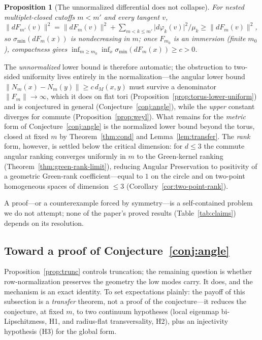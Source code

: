 \documentclass[11pt]{article}
\newtheorem{proposition}[theorem]{Proposition}
\theoremstyle{remark}
\begin{document}
\begin{proposition}[The unnormalized differential does not collapse]\label{prop:sigmamin}
For nested multiplet-closed cutoffs $m<m'$ and every tangent $v$,
$\lVert dF_{m'}(v)\rVert^2=\lVert dF_m(v)\rVert^2+\sum_{m<k\le m'}\lvert d\varphi_k(v)\rvert^2/\mu_k
\ge\lVert dF_m(v)\rVert^2$, so $\sigma_{\min}(dF_m(x))$ is nondecreasing in $m$;
once $F_{m_0}$ is an immersion (finite $m_0$ \cite{berard1994}), compactness gives
$\inf_{m\ge m_0}\inf_{x}\sigma_{\min}(dF_m(x))\ge c>0$.
\end{proposition}

\noindent The \emph{unnormalized} lower bound is therefore automatic; the
obstruction to two-sided uniformity lives entirely in the normalization---the
angular lower bound $\lVert N_m(x)-N_m(y)\rVert\ge c\,d_M(x,y)$ must survive a
denominator $\lVert F_m\rVert\to\infty$, which it does on flat tori
(Proposition~\ref{prop:torus-lower-uniform}) and is conjectured in general
(Conjecture~\ref{conj:angle}), while the \emph{upper} constant diverges for commute
(Proposition~\ref{prop:weyl}). What remains for the \emph{metric} form of
Conjecture~\ref{conj:angle} is the normalized lower bound beyond the torus, closed at
fixed $m$ by Theorem~\ref{thm:cond} and Lemma~\ref{lem:transfer}. The \emph{rank}
form, however, is settled below the critical dimension: for $d\le3$ the commute
angular ranking converges uniformly in $m$ to the Green-kernel ranking
(Theorem~\ref{thm:green-rank-limit}), reducing Angular Preservation to positivity of a
geometric Green-rank coefficient---equal to $1$ on the circle and on two-point
homogeneous spaces of dimension $\le3$ (Corollary~\ref{cor:two-point-rank}).

\noindent A proof---or a counterexample forced by symmetry---is a self-contained
problem we do not attempt; none of the paper's proved results
(Table~\ref{tab:claims}) depends on its resolution.

\subsection{Toward a proof of Conjecture~\ref{conj:angle}}\label{sec:towardproof}
Proposition~\ref{prop:trunc} controls truncation; the remaining question is
whether row-normalization preserves the geometry the low modes carry. It does,
and the mechanism is an exact identity. To set expectations plainly: the payoff
of this subsection is a \emph{transfer} theorem, not a proof of the
conjecture---it reduces the conjecture, at fixed $m$, to two continuum
hypotheses (local eigenmap bi-Lipschitzness, H1, and radius-flat
transversality, H2), plus an injectivity hypothesis (H3) for the global form.
\end{document}
